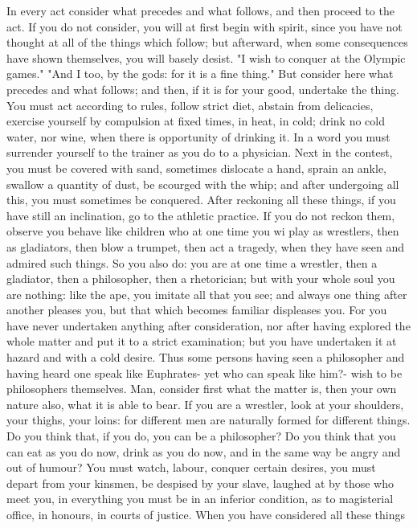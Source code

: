\documentclass[a4paper]{article}
\begin{document}
    In every act consider what precedes and what follows, and then proceed to
the act. If you do not consider, you will at first begin with spirit, since you
have not thought at all of the things which follow; but afterward, when some
consequences have shown themselves, you will basely desist. "I wish to conquer
at the Olympic games." "And I too, by the gods: for it is a fine thing." But
consider here what precedes and what follows; and then, if it is for your good,
undertake the thing. You must act according to rules, follow strict diet,
abstain from delicacies, exercise yourself by compulsion at fixed times, in
heat, in cold; drink no cold water, nor wine, when there is opportunity of
drinking it. In a word you must surrender yourself to the trainer as you do to
a physician. Next in the contest, you must be covered with sand, sometimes
dislocate a hand, sprain an ankle, swallow a quantity of dust, be scourged with
the whip; and after undergoing all this, you must sometimes be conquered. After
reckoning all these things, if you have still an inclination, go to the
athletic practice. If you do not reckon them, observe you behave like children
who at one time you wi play as wrestlers, then as gladiators, then blow a
trumpet, then act a tragedy, when they have seen and admired such things. So
you also do: you are at one time a wrestler, then a gladiator, then a
philosopher, then a rhetorician; but with your whole soul you are nothing: like
the ape, you imitate all that you see; and always one thing after another
pleases you, but that which becomes familiar displeases you. For you have never
undertaken anything after consideration, nor after having explored the whole
matter and put it to a strict examination; but you have undertaken it at hazard
and with a cold desire. Thus some persons having seen a philosopher and having
heard one speak like Euphrates- yet who can speak like him?- wish to be
philosophers themselves.
    Man, consider first what the matter is, then your own nature also, what it
is able to bear. If you are a wrestler, look at your shoulders, your thighs,
your loins: for different men are naturally formed for different things. Do you
think that, if you do, you can be a philosopher? Do you think that you can eat
as you do now, drink as you do now, and in the same way be angry and out of
humour? You must watch, labour, conquer certain desires, you must depart from
your kinsmen, be despised by your slave, laughed at by those who meet you, in
everything you must be in an inferior condition, as to magisterial office, in
honours, in courts of justice. When you have considered all these things
\end{document}
